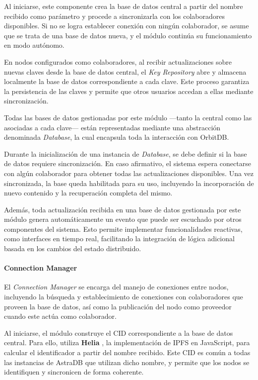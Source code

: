 Al iniciarse, este componente crea la base de datos central a partir del nombre recibido como parámetro y procede a sincronizarla con los colaboradores disponibles. Si no se logra establecer conexión con ningún colaborador, se asume que se trata de una base de datos nueva, y el módulo continúa su funcionamiento en modo autónomo.

En nodos configurados como colaboradores, al recibir actualizaciones sobre nuevas claves desde la base de datos central, el \textit{Key Repository} abre y almacena localmente la base de datos correspondiente a cada clave. Este proceso garantiza la persistencia de las claves y permite que otros usuarios accedan a ellas mediante sincronización.

Todas las bases de datos gestionadas por este módulo —tanto la central como las asociadas a cada clave— están representadas mediante una abstracción denominada \textit{Database}, la cual encapsula toda la interacción con OrbitDB.

Durante la inicialización de una instancia de \textit{Database}, se debe definir si la base de datos requiere sincronización. En caso afirmativo, el sistema espera conectarse con algún colaborador para obtener todas las actualizaciones disponibles. Una vez sincronizada, la base queda habilitada para su uso, incluyendo la incorporación de nuevo contenido y la recuperación completa del mismo.

Además, toda actualización recibida en una base de datos gestionada por este módulo genera automáticamente un evento que puede ser escuchado por otros componentes del sistema. Esto permite implementar funcionalidades reactivas, como interfaces en tiempo real, facilitando la integración de lógica adicional basada en los cambios del estado distribuido.

\paragraph{Connection Manager}

El \textit{Connection Manager} se encarga del manejo de conexiones entre nodos, incluyendo la búsqueda y establecimiento de conexiones con colaboradores que proveen la base de datos, así como la publicación del nodo como proveedor cuando este actúa como colaborador.

Al iniciarse, el módulo construye el CID correspondiente a la base de datos central. Para ello, utiliza \textbf{Helia} \cite{helia}, la implementación de IPFS en JavaScript, para calcular el identificador a partir del nombre recibido. Este CID es común a todas las instancias de AstraDB que utilizan dicho nombre, y permite que los nodos se identifiquen y sincronicen de forma coherente.

